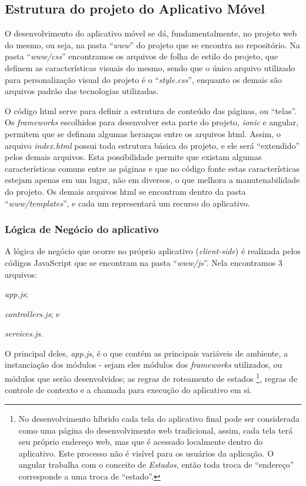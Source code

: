 \subsection{Estrutura do projeto do Aplicativo Móvel}
O desenvolvimento do aplicativo móvel se dá, fundamentalmente, no projeto web do mesmo, ou seja, na pasta ``\textit{www}'' do projeto que se encontra no repositório. Na pasta ``\textit{www/css}'' encontramos os arquivos de folha de estilo do projeto, que definem as características visuais do mesmo, sendo que o único arquivo utilizado para personalização visual do projeto é o ``\textit{style.css}'', enquanto os demais são arquivos padrão das tecnologias utilizadas.

O código \gls{html} serve para definir a estrutura de conteúdo das páginas, ou ``telas''. Os \textit{frameworks} escolhidos para desenvolver esta parte do projeto, \textit{ionic} e \gls{angular}, permitem que se definam algumas heranças entre os arquivos \gls{html}. Assim, o arquivo \textit{index.html} possui toda estrutura básica do projeto, e ele será ``extendido'' pelos demais arquivos. Esta possibilidade permite que existam algumas características comuns entre as páginas e que no código fonte estas características estejam apenas em um lugar, não em diversos, o que melhora a manutenabilidade do projeto. Os demais arquivos \gls{html} se encontram dentro da pasta ``\textit{www/templates}'', e cada um representará um recurso do aplicativo.

\subsubsection{Lógica de Negócio do aplicativo}
A lógica de negócio que ocorre no próprio aplicativo (\textit{client-side}) é realizada pelos códigos JavaScript que se encontram na pasta ``\textit{www/js}''. Nela encontramos 3 arquivos:
\begin{enumerate*}[label=\itshape\alph*\upshape)]
    \item \textit{app.js};
    \item \textit{controllers.js}; e
    \item \textit{services.js}.
\end{enumerate*}

O principal deles, \textit{app.js}, é o que contém as principais variáveis de ambiente, a instanciação dos módulos - sejam eles módulos dos \textit{frameworks} utilizados, ou módulos que serão desenvolvidos; as regras de roteamento de estados%
\footnote{No desenvolvimento híbrido cada tela do aplicativo final pode ser considerada como uma página do desenvolvimento web tradicional, assim, cada tela terá seu próprio endereço web, mas que é acessado localmente dentro do aplicativo. Este processo não é visível para os usuários da aplicação. O \gls{angular} trabalha com o conceito de \textit{Estados}, então toda troca de ``endereço'' corresponde a uma troca de ``estado''.},
regras de controle de contexto e a chamada para execução do aplicativo em si.

